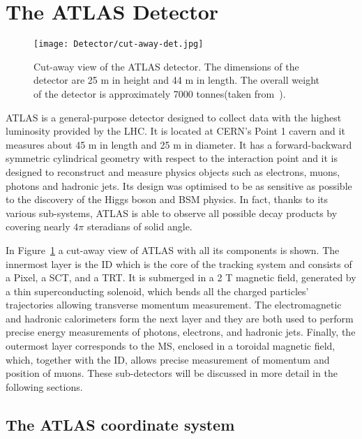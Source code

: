 	\section{The ATLAS Detector}
	\label{sec:det}

		\begin{figure}[!htb]
			\texttt{[image: Detector/cut-away-det.jpg]}
			\caption{Cut-away view of the \ac{ATLAS} detector. The dimensions of the detector are 25 m in height and 44 m in length. The overall weight of the detector is approximately 7000 tonnes(taken from~\cite{Lefevre2008}).}
			\label{fig:cut-away-det}
		\end{figure}


		\ac{ATLAS} is a general-purpose detector designed to collect data with the highest luminosity provided by the \ac{LHC}. It is located at \ac{CERN}'s Point 1 cavern and it measures about 45 m in length and 25 m in diameter. It has a forward-backward symmetric cylindrical geometry with respect to the interaction point and it is designed to reconstruct and measure physics objects such as electrons, muons, photons and hadronic jets. Its design was optimised to be as sensitive as possible to the discovery of the Higgs boson and \ac{BSM} physics. In fact, thanks to its various sub-systems, \ac{ATLAS} is able to observe all possible decay products by covering nearly $4\pi$ steradians of solid angle.

		In Figure~\ref{fig:cut-away-det} a cut-away view of \ac{ATLAS} with all its components is shown. The innermost layer is the \ac{ID} which is the core of the tracking system and consists of a Pixel, a \ac{SCT}, and a \ac{TRT}. It is submerged in a 2 T magnetic field, generated by a thin superconducting solenoid, which bends all the charged particles' trajectories allowing transverse momentum measurement. The electromagnetic and hadronic calorimeters form the next layer and they are both used to perform precise energy measurements of photons, electrons, and hadronic jets. Finally, the outermost layer corresponds to the \ac{MS}, enclosed in a toroidal magnetic field, which, together with the \ac{ID},  allows precise measurement of momentum and position of muons. These sub-detectors will be discussed in more detail in the following sections. 
	

		\subsection*{The ATLAS coordinate system}
		\label{par:coord}
			
